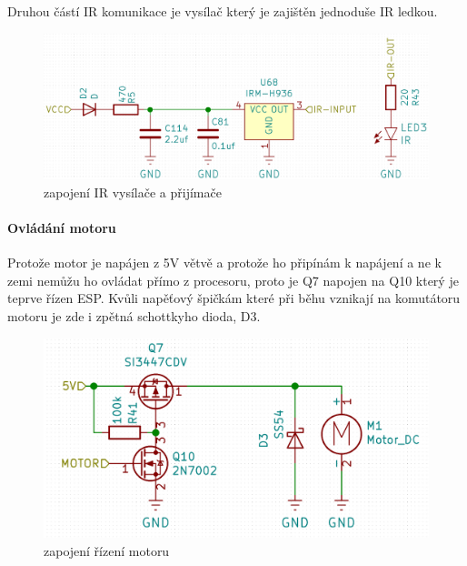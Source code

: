 Druhou částí IR komunikace je vysílač který je zajištěn jednoduše IR ledkou.

\begin{figure}[htbp]
    \centering
    \includegraphics[width=\textwidth]{kapitoly/obrazky/E4/ir_motor_enkoder/IR.png}
    \caption{zapojení IR vysílače a přijímače}
    \label{fig:E4-ir}
\end{figure}

\newpage

\paragraph{Ovládání motoru}
Protože motor je napájen z 5V větvě a protože ho připínám k napájení a ne k zemi nemůžu ho ovládat přímo z procesoru, proto je Q7 napojen na Q10 který je teprve řízen ESP. 
Kvůli napěťový špičkám které při běhu vznikají na komutátoru motoru je zde i zpětná schottkyho dioda, D3.%

\begin{figure}[htbp]
    \centering
    \includegraphics[width=\textwidth]{kapitoly/obrazky/E4/ir_motor_enkoder/ovladani_motoru.png}
    \caption{zapojení řízení motoru}
    \label{fig:E4-motor}
\end{figure}

